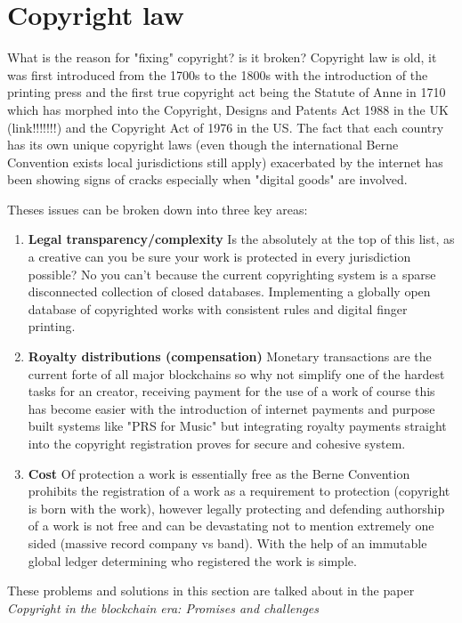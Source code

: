 \documentclass[12pt]{report}
\begin{document}
\section{Copyright law}

What is the reason for "fixing" copyright? is it broken? Copyright law is old, it was first introduced from the 1700s to the 1800s with the introduction of the printing press and the first true copyright act being the Statute of Anne in 1710 which has morphed into the Copyright, Designs and Patents Act 1988 in the UK (link!!!!!!!) and the Copyright Act of 1976 in the US. The fact that each country has its own unique copyright laws (even though the international Berne Convention exists local jurisdictions still apply) exacerbated by the internet has been showing signs of cracks especially when "digital goods" are involved.

Theses issues can be broken down into three key areas: 

\begin{enumerate}
	\item \textbf{Legal transparency/complexity} Is the absolutely at the top of this list, as a creative can you be sure your work is protected in every jurisdiction possible? No you can't because the current copyrighting system is a sparse disconnected collection of closed databases. Implementing a globally open database of copyrighted works with consistent rules and digital finger printing. 
	\item \textbf{Royalty distributions (compensation)} Monetary transactions are the current forte of all major blockchains so why not simplify one of the hardest tasks for an creator, receiving payment for the use of a work of course this has become easier with the introduction of internet payments and purpose built systems like "PRS for Music" but integrating royalty payments straight into the copyright registration proves for secure and cohesive system.
	\item \textbf{Cost} Of protection a work is essentially free as the Berne Convention prohibits the registration of a work as a requirement to protection (copyright is born with the work), however legally protecting and defending authorship of a work is not free and can be devastating not to mention extremely one sided (massive record company vs band). With the help of an immutable global ledger determining who registered the work is simple. %
\end{enumerate}

These problems and solutions in this section are talked about in the paper \textit{Copyright in the blockchain era: Promises and challenges} \cite{Copyright_in_the_blockchain_era}
\end{document}
